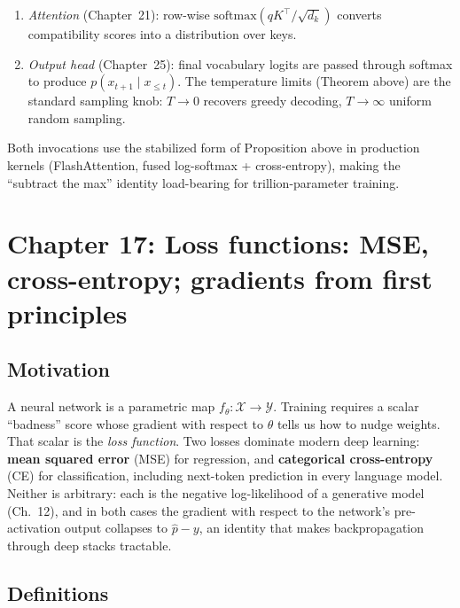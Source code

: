 \documentclass[11pt]{article}
\theoremstyle{remark}
\begin{document}
\begin{enumerate}
\item \emph{Attention} (Chapter~21): row-wise $\mathrm{softmax}(qK^\top/\sqrt{d_k})$ converts compatibility scores into a distribution over keys.
\item \emph{Output head} (Chapter~25): final vocabulary logits are passed through softmax to produce $p(x_{t+1}\mid x_{\le t})$. The temperature limits (Theorem above) are the standard sampling knob: $T\to 0$ recovers greedy decoding, $T\to\infty$ uniform random sampling.
\end{enumerate}

Both invocations use the stabilized form of Proposition above in production kernels (FlashAttention, fused log-softmax + cross-entropy), making the ``subtract the max'' identity load-bearing for trillion-parameter training.


\section*{Chapter 17: Loss functions: MSE, cross-entropy; gradients from first principles}

\subsection*{Motivation}

A neural network is a parametric map $f_\theta : \mathcal{X} \to \mathcal{Y}$. Training requires a scalar
``badness'' score whose gradient with respect to $\theta$ tells us how to nudge weights. That scalar is the
\emph{loss function}. Two losses dominate modern deep learning: \textbf{mean squared error} (MSE) for
regression, and \textbf{categorical cross-entropy} (CE) for classification, including next-token prediction
in every language model. Neither is arbitrary: each is the negative log-likelihood of a generative model
(Ch.~12), and in both cases the gradient with respect to the network's pre-activation output collapses to
$\hat p - y$, an identity that makes backpropagation through deep stacks tractable.

\subsection*{Definitions}
\end{document}
